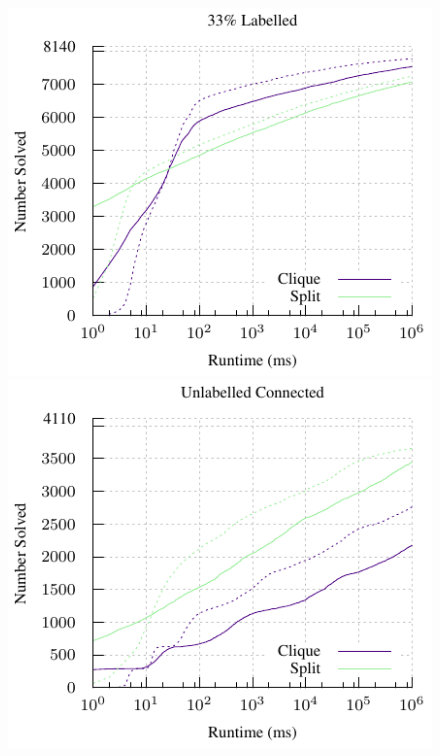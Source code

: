 \documentclass{llncs}
\begin{document}
\begin{figure}[p]
    \vspace*{1em}
    \includegraphics*[scale=0.7]{plots/33ved-par-cumulative.pdf}
    \hfill
    \includegraphics*[scale=0.7]{plots/plain-connected-par-cumulative.pdf}


\end{figure}
\end{document}
